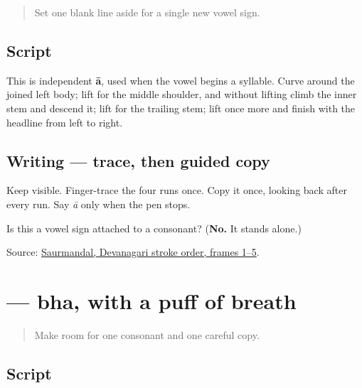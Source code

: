 \begin{quote}
Set one blank line aside for a single new vowel sign.
\end{quote}

\subsection*{Script}
\begin{quote}
\end{quote}

This is independent \textbf{ā}, used when the vowel begins a syllable. Curve around the joined left body; lift for the middle shoulder, and without lifting climb the inner stem and descend it; lift for the trailing stem; lift once more and finish with the headline from left to right.

\subsection*{Writing — trace, then guided copy}

Keep \textbf{} visible. Finger-trace the four runs once. Copy it once, looking back after every run. Say \emph{ā} only when the pen stops.

\begin{tcolorbox}[breakable,colback=teal!4,colframe=teal!35!black,title={Before you move on}]
Is this a vowel sign attached to a consonant? (\textbf{No.} It stands alone.)

Source: \href{https://commons.wikimedia.org/wiki/File:Devanagari\_\%E0\%A4\%86\_stroke\_order.svg}{Saurmandal, Devanagari  stroke order, frames 1–5}.
\end{tcolorbox}
\section[\texorpdfstring{\mr{भ} (bha)}{भ (bha)}]{ — bha, with a puff of breath}

\label{lesson:MR-W02-bha}



\begin{quote}
Make room for one consonant and one careful copy.
\end{quote}

\subsection*{Script}
\begin{quote}
\end{quote}

